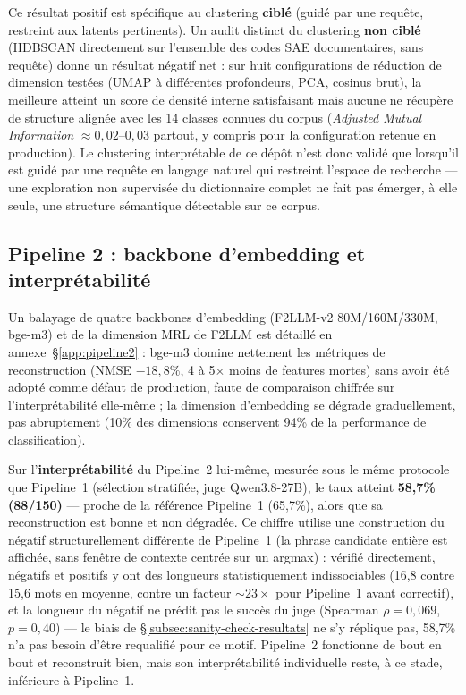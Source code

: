 \documentclass[11pt]{article}
\begin{document}
Ce résultat positif est spécifique au clustering \textbf{ciblé} (guidé par
une requête, restreint aux latents pertinents). Un audit distinct du
clustering \textbf{non ciblé} (HDBSCAN directement sur l'ensemble des codes
SAE documentaires, sans requête) donne un résultat négatif net : sur huit
configurations de réduction de dimension testées (UMAP à différentes
profondeurs, PCA, cosinus brut), la meilleure atteint un score de densité
interne satisfaisant mais aucune ne récupère de structure alignée avec les
14 classes connues du corpus (\emph{Adjusted Mutual Information}
$\approx 0,02$--$0,03$ partout, y compris pour la configuration retenue en
production). Le clustering interprétable de ce dépôt n'est donc validé que
lorsqu'il est guidé par une requête en langage naturel qui restreint
l'espace de recherche --- une exploration non supervisée du dictionnaire
complet ne fait pas émerger, à elle seule, une structure sémantique
détectable sur ce corpus.

\subsection{Pipeline 2 : backbone d'embedding et interprétabilité}
\label{subsec:pipeline2-scale}

Un balayage de quatre backbones d'embedding (F2LLM-v2 80M/160M/330M, bge-m3)
et de la dimension MRL de F2LLM est détaillé en annexe~\S\ref{app:pipeline2}
: bge-m3 domine nettement les métriques de reconstruction (NMSE $-18,8\%$,
4 à 5$\times$ moins de features mortes) sans avoir été adopté comme défaut de
production, faute de comparaison chiffrée sur l'interprétabilité elle-même ;
la dimension d'embedding se dégrade graduellement, pas abruptement (10\% des
dimensions conservent 94\% de la performance de classification).

Sur l'\textbf{interprétabilité} du Pipeline~2 lui-même, mesurée sous le même
protocole que Pipeline~1 (sélection stratifiée, juge Qwen3.8-27B), le taux
atteint \textbf{58,7\% (88/150)} --- proche de la référence Pipeline~1
(65,7\%), alors que sa reconstruction est bonne et non dégradée. Ce chiffre
utilise une construction du négatif structurellement différente de
Pipeline~1 (la phrase candidate entière est affichée, sans fenêtre de
contexte centrée sur un argmax) : vérifié directement, négatifs et positifs
y ont des longueurs statistiquement indissociables (16,8 contre 15,6 mots en
moyenne, contre un facteur ${\sim}23\times$ pour Pipeline~1 avant correctif),
et la longueur du négatif ne prédit pas le succès du juge (Spearman
$\rho=0,069$, $p=0,40$) --- le biais de \S\ref{subsec:sanity-check-resultats}
ne s'y réplique pas, 58,7\% n'a pas besoin d'être requalifié pour ce motif.
Pipeline~2 fonctionne de bout en bout et reconstruit bien, mais son
interprétabilité individuelle reste, à ce stade, inférieure à Pipeline~1.
\end{document}
